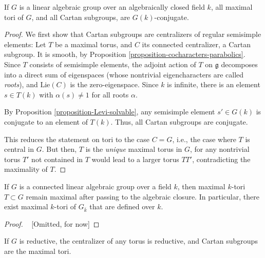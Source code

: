 \begin{theorem}
\label{theorem-Cartan-tori-conjugate}
If $G$ is a linear algebraic group over an algebraically closed field $k$, all maximal tori of $G$, and all Cartan subgroups, are $G(k)$-conjugate.
\end{theorem}


\begin{proof}
We first show that Cartan subgroups are centralizers of regular semisimple elements: Let $T$ be a maximal torus, and $C$ its connected centralizer, a Cartan subgroup. It is smooth, by Proposition \ref{proposition-cocharacters-parabolics}. Since $T$ consists of semisimple elements, the adjoint action of $T$ on $\mathfrak g$ decomposes into a direct sum of eigenspaces (whose nontrivial eigencharacters are called \emph{roots}), and $\text{Lie}(C)$ is the zero-eigenspace. Since $k$ is infinite, there is an element $s\in T(k)$ with $\alpha(s)\ne 1$ for all roots $\alpha$. 

By Proposition \ref{proposition-Levi-solvable}, any semisimple element $s'\in G(k)$ is conjugate to an element of $T(k)$. Thus, all Cartan subgroups are conjugate. 

This reduces the statement on tori to the case $C=G$, i.e., the case where $T$ is central in $G$. But then, $T$ is the \emph{unique} maximal torus in $G$, for any nontrivial torus $T'$ not contained in $T$ would lead to a larger torus $TT'$, contradicting the maximality of $T$.
\end{proof}





\begin{theorem}
\label{theorem-maximal-tori-exist}
If $G$ is a connected linear algebraic group over a field $k$, then maximal $k$-tori $T\subset G$ remain maximal after passing to the algebraic closure. In particular, there exist maximal $k$-tori of $G_{\bar k}$ that are defined over $k$.
\end{theorem}

\begin{proof}
~ [Omitted, for now]
\end{proof}




\begin{proposition}
\label{proposition-Cartan-reductive}
If $G$ is reductive, the centralizer of any torus is reductive, and Cartan subgroups are the maximal tori. 
\end{proposition}

